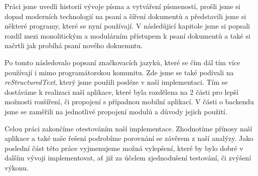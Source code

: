 Práci jsme uvedli historií vývoje písma a vytváření písmeností, prošli jsme si dopad moderních technologií na psaní a šíření dokumentů a představili jsme si
některé programy, které se nyní používají. V následůjicí kapitole jsme si popsali rozdíl mezi monolitickým a modulárním přístupem k psaní dokumentů a také si
načrtli jak probíhá psaní nového dokuemntu.

Po tomto následovalo popsaní značkovacích jazyků, které se čím dál tím více používají i mimo programátorskou komunitu. Zde jsme se také podívali na
\textit{reStructuredText}, který jsme použili posléze v naší implementaci. Tím se dostáváme k realizaci naší aplikace, které byla rozdělena na 2 části
pro lepší možnosti rozšíření, či propojení s případnou mobilní aplikací. V části o backendu jsme se zaměřili na jednotlivé propojení modulů a důvody jejich
použití.

Celou práci zakončíme otestováním naší implementace. Zhodnotíme přínosy naší aplikace a také naše řešení podrobíme porovnání se závěrem z naší analýzy. Jako poslední
část této práce vyjmenujeme možná vylepšení, které by bylo dobré v dalším vývoji implementovat, ať již za účelem zjednodušení testování, či zvýšení výkonu.